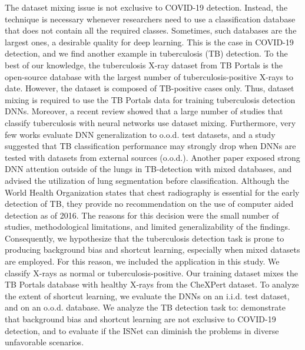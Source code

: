 \documentclass[fleqn,10pt]{wlscirep}
\begin{document}
The dataset mixing issue is not exclusive to COVID-19 detection. Instead, the technique is necessary whenever researchers need to use a classification database that does not contain all the required classes. Sometimes, such databases are the largest ones, a desirable quality for deep learning. This is the case in COVID-19 detection, and we find another example in tuberculosis (TB) detection. To the best of our knowledge, the tuberculosis X-ray dataset from TB Portals\cite{TBPortals} is the open-source database with the largest number of tuberculosis-positive X-rays to date. However, the dataset is composed of TB-positive cases only. Thus, dataset mixing is required to use the TB Portals data for training tuberculosis detection DNNs. Moreover, a recent review\cite{TBReview} showed that a large number of studies that classify tuberculosis with neural networks use dataset mixing. Furthermore, very few works evaluate DNN generalization to o.o.d. test datasets\cite{TBReview}, and a study suggested that TB classification performance may strongly drop when DNNs are tested with datasets from external sources (o.o.d.)\cite{TBBadGeneralization}. Another paper exposed strong DNN attention outside of the lungs in TB-detection with mixed databases, and advised the utilization of lung segmentation before classification\cite{TBSegmentation}. Although the World Health Organization states that chest radiography is essential for the early detection of TB, they provide no recommendation on the use of computer aided detection as of 2016\cite{who}. The reasons for this decision were the small number of studies, methodological limitations, and limited generalizability of the findings\cite{who}. Consequently, we hypothesize that the tuberculosis detection task is prone to producing background bias and shortcut learning, especially when mixed datasets are employed. For this reason, we included the application in this study. We classify X-rays as normal or tuberculosis-positive. Our training dataset mixes the TB Portals database\cite{TBPortals} with healthy X-rays from the CheXPert dataset\cite{irvin2019chexpert}. To analyze the extent of shortcut learning, we evaluate the DNNs on an i.i.d. test dataset, and on an o.o.d. database\cite{ChineseDataset1}. We analyze the TB detection task to: demonstrate that background bias and shortcut learning are not exclusive to COVID-19 detection, and to evaluate if the ISNet can diminish the problems in diverse unfavorable scenarios.
\end{document}
